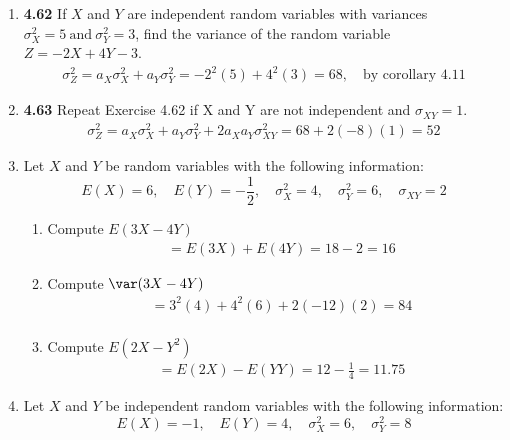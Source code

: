 \documentclass[basic, header]{nosvagor-notes}
\begin{document}
\begin{enumerate}[leftmargin=1.5em, itemsep=2em]
  \newpage %

  \item \textbf{4.62} If \(X\) and \(Y\) are independent random variables with
    variances \(\sigma^2_X = 5 ~\text{and}~ \sigma^2_Y = 3\), find the variance
    of the random variable \(Z = -2X + 4Y - 3\).
    \begin{align*}
      \sigma^2_Z = a_X\sigma^2_X + a_Y\sigma^2_Y = -2^2(5) + 4^2(3) = \boxed{68}, \quad \text{by corollary 4.11}
    \end{align*}

  \item \textbf{4.63} Repeat Exercise 4.62 if X and Y are not independent and
    \(\sigma_{XY} = 1\).
    \begin{align*}
      \sigma^2_Z = a_X\sigma^2_X + a_Y\sigma^2_Y + 2a_Xa_Y\sigma^2_{XY} = 68 + 2(-8)(1) = \boxed{52}
    \end{align*}

  \item Let \(X\) and \(Y\) be random variables with the following information:
    \[%
     E(X) = 6, \quad E(Y) = -\frac{1}{2}, \quad \sigma^2_X = 4, \quad \sigma^2_Y = 6, \quad \sigma_{XY} = 2
    \]%
    \begin{enumerate}[leftmargin=1.6em]

      \item Compute \(E(3X - 4Y)\)
        \begin{align*}
          &= E(3X) + E(4Y) = 18 - 2 = \boxed{16}
        \end{align*}
      \item Compute \(\var(3X - 4Y)\)
        \begin{align*}
          &= 3^2(4) + 4^2(6) + 2(-12)(2)= \boxed{84}\\
        \end{align*}
      \item Compute \(E(2X - Y^2)\)
        \begin{align*}
          &= E(2X) - E(YY) = 12 - \frac{1}{4} = \boxed{11.75}
        \end{align*}

    \end{enumerate}

  \item Let \(X\) and \(Y\) be independent random variables with the following
    information:
    \[%
     E(X) = -1, \quad E(Y) = 4, \quad \sigma^2_X = 6, \quad \sigma^2_Y = 8
    \]%
    \begin{enumerate}[leftmargin=1.6em]


\end{enumerate}
\end{enumerate}
\end{document}
